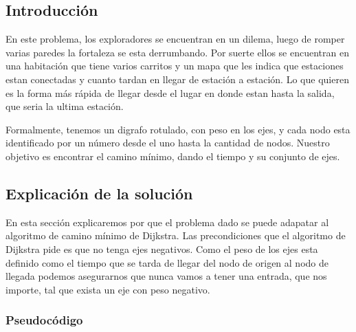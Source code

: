\documentclass[spanish,12pt]{article}
\begin{document}
\subsection{Introducción}

En este problema, los exploradores se encuentran en un dilema, luego de romper varias paredes la fortaleza se esta derrumbando. Por suerte ellos se encuentran en una habitación que tiene varios carritos y un mapa que les indica que estaciones estan conectadas y cuanto tardan en llegar de estación a estación. Lo que quieren es la forma más rápida de llegar desde el lugar en donde estan hasta la salida, que seria la ultima estación.

Formalmente, tenemos un digrafo rotulado, con peso en los ejes, y cada nodo esta identificado por un número desde el uno hasta la cantidad de nodos. Nuestro objetivo es encontrar el camino mínimo, dando el tiempo y su conjunto de ejes.


\subsection{Explicación de la solución}

   En esta sección explicaremos por que el problema dado se puede adapatar al algoritmo de camino mínimo de Dijkstra.
 Las precondiciones que el algoritmo de Dijkstra pide es que no tenga ejes negativos. Como el peso de los ejes esta definido como el tiempo que se tarda de llegar del nodo de origen al nodo de llegada podemos asegurarnos que nunca vamos a tener una entrada, que nos importe, tal que exista un eje con peso negativo. 

\subsubsection{Pseudocódigo}
\end{document}
